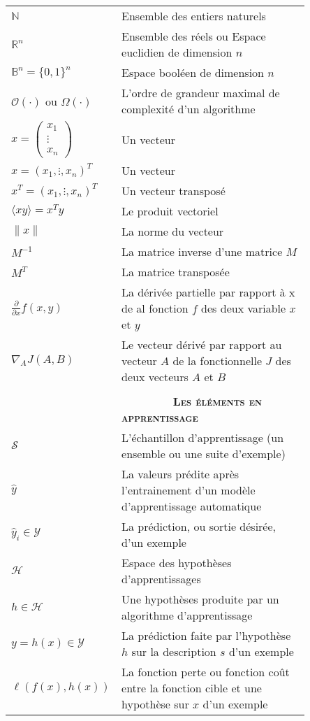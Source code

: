 \begin{tabular}{l p{0.85\linewidth}}
	$\mathbb{N} $ & Ensemble des entiers naturels\\
	$\mathbb{R}^n $ & Ensemble des réels ou  Espace euclidien de dimension $n$ \\
	$\mathbb{B}^n = \{0,1\}^n $ & Espace booléen de dimension $n$\\
	$\mathcal{O}(\cdot) $ ou $ {\Omega}(\cdot) $ & L'ordre de grandeur maximal de complexité d'un algorithme \\
	
	
	$x = \begin{pmatrix}
		x_1 \\ \vdots \\ x_n 
	\end{pmatrix} $ & Un vecteur\\ 
	$x =  (x_1, \vdots,  x_n)^T$ & Un vecteur \\ 
	$x^T =  (x_1, \vdots,  x_n)^T$ & Un vecteur transposé \\ 
	$ \langle xy\rangle = x^Ty$  & Le produit vectoriel \\ 
	$\parallel x \parallel $ & La norme du vecteur\\
	
	 
	$M^{-1}$ & La matrice inverse d'une matrice $M$\\
	$M^{T}$ & La matrice transposée \\
	
	$\frac{\partial}{\partial x}f(x,y) $ & La dérivée partielle par rapport à x de al fonction $f$ des deux variable $x$ et $y$ \\ 
	
	$\nabla_A J(A,B) $ & Le vecteur dérivé par rapport au vecteur $A$ de la fonctionnelle $J$ des deux vecteurs $A$ et $B$ \\ 
	
	$ $ & \\
	
	 $ $ & \textbf{  \ \ \ \ \ \ \ \ \textsc{Les éléments en apprentissage}} \\
	
	$ \mathcal{S} $ & L'échantillon d'apprentissage (un ensemble ou une suite d'exemple)  \\ 
	$ \hat{y}$ & La valeurs prédite après l'entrainement d'un modèle d'apprentissage automatique \\ 
	$ \hat{y}_i \in  \mathcal{Y} $ & La prédiction, ou sortie désirée, d'un exemple \\
	$ \mathcal{H} $ &  Espace des hypothèses d'apprentissages \\
	$ h \in \mathcal{H} $ & Une hypothèses produite par un algorithme d'apprentissage \\
	$ y = h(x) \in \mathcal{Y} $ & La prédiction faite par l'hypothèse $h$ sur la description $s$ d'un exemple \\
	$ \ell(f(x),h(x)) $ & La fonction perte ou fonction coût entre la fonction  cible et une hypothèse sur $x$ d'un exemple \\
	

\end{tabular}
